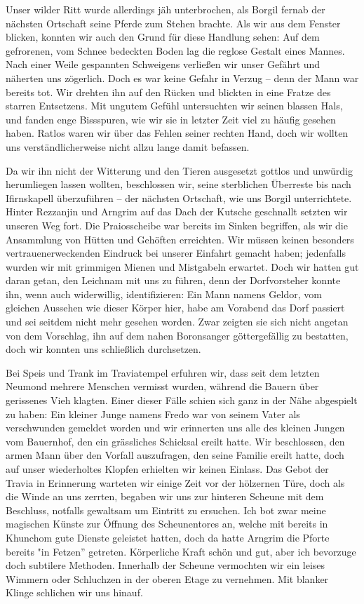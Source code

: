 Unser wilder Ritt wurde allerdings jäh unterbrochen, als Borgil fernab der nächsten Ortschaft seine Pferde zum Stehen brachte. Als wir aus dem Fenster blicken, konnten wir auch den Grund für diese Handlung sehen: Auf dem gefrorenen, vom Schnee bedeckten Boden lag die reglose Gestalt eines Mannes. Nach einer Weile gespannten Schweigens verließen wir unser Gefährt und näherten uns zögerlich. Doch es war keine Gefahr in Verzug -- denn der Mann war bereits tot. Wir drehten ihn auf den Rücken und blickten in eine Fratze des starren Entsetzens. Mit ungutem Gefühl untersuchten wir seinen blassen Hals, und fanden enge Bissspuren, wie wir sie in letzter Zeit viel zu häufig gesehen haben. Ratlos waren wir über das Fehlen seiner rechten Hand, doch wir wollten uns verständlicherweise nicht allzu lange damit befassen. \par

Da wir ihn nicht der Witterung und den Tieren ausgesetzt gottlos und unwürdig herumliegen lassen wollten, beschlossen wir, seine sterblichen Überreste bis nach Ifirnskapell überzuführen -- der nächsten Ortschaft, wie uns Borgil unterrichtete. Hinter Rezzanjin und Arngrim auf das Dach der Kutsche geschnallt setzten wir unseren Weg fort. Die Praiosscheibe war bereits im Sinken begriffen, als wir die Ansammlung von Hütten und Gehöften erreichten. Wir müssen keinen besonders vertrauenerweckenden Eindruck bei unserer Einfahrt gemacht haben; jedenfalls wurden wir mit grimmigen Mienen und Mistgabeln erwartet. Doch wir hatten gut daran getan, den Leichnam mit uns zu führen, denn der Dorfvorsteher konnte ihn, wenn auch widerwillig, identifizieren: Ein Mann namens Geldor, vom gleichen Aussehen wie dieser Körper hier, habe am Vorabend das Dorf passiert und sei seitdem nicht mehr gesehen worden. Zwar zeigten sie sich nicht angetan von dem Vorschlag, ihn auf dem nahen Boronsanger göttergefällig zu bestatten, doch wir konnten uns schließlich durchsetzen.\par

Bei Speis und Trank im Traviatempel erfuhren wir, dass seit dem letzten Neumond mehrere Menschen vermisst wurden, während die Bauern über gerissenes Vieh klagten. Einer dieser Fälle schien sich ganz in der Nähe abgespielt zu haben: Ein kleiner Junge namens Fredo war von seinem Vater als verschwunden gemeldet worden und wir erinnerten uns alle des kleinen Jungen vom Bauernhof, den ein grässliches Schicksal ereilt hatte. Wir beschlossen, den armen Mann über den Vorfall auszufragen, den seine Familie ereilt hatte, doch auf unser wiederholtes Klopfen erhielten wir keinen Einlass. Das Gebot der Travia in Erinnerung warteten wir einige Zeit vor der hölzernen Türe, doch als die Winde an uns zerrten, begaben wir uns zur hinteren Scheune mit dem Beschluss, notfalls gewaltsam um Eintritt zu ersuchen. Ich bot zwar meine magischen Künste zur Öffnung des Scheunentores an, welche mit bereits in Khunchom gute Dienste geleistet hatten, doch da hatte Arngrim die Pforte bereits "in Fetzen'' getreten. Körperliche Kraft schön und gut, aber ich bevorzuge doch subtilere Methoden. Innerhalb der Scheune vermochten wir ein leises Wimmern oder Schluchzen in der oberen Etage zu vernehmen. Mit blanker Klinge schlichen wir uns hinauf. \par

